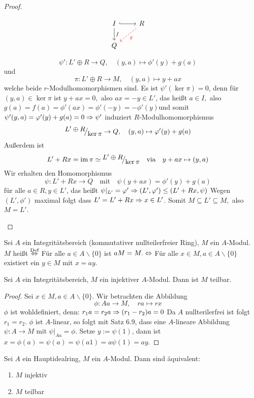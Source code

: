 \begin{proof}
\begin{enumerate}
\begin{minipage}[t]{0.7\textwidth}
		\end{minipage}
		\begin{minipage}[t]{0.3\textwidth} 
			$$\begin{tikzcd}
			I \arrow[hook]{r} \arrow{d}{f}& R \arrow[dashed,red]{dl}{g}\\ Q &
			\end{tikzcd}$$
		\end{minipage}
	 $$\psi': L' \oplus R \to Q,\quad (y,a) \mapsto \phi'(y) + g(a) $$
	und 
	$$\pi: L' \oplus R \to M,\quad(y,a) \mapsto y +ax$$
		welche beide $r$-Modulhomomorphismen sind. Es ist $\psi'(\ker\pi) = 0$, denn für $(y,a) \in \ker\pi$ ist $ y+ax=0,$ also $ax=-y \in L'$, das heißt $a \in I,$ also $g(a)=f(a)=\phi'(ax)=\phi'(-y) = -\phi'(y) $und somit $\psi'(y,a) = \varphi'(y)+g(a) = 0 \Rightarrow \psi'$ induziert $R$-Modulhomomorphismus $$\QR{L' \oplus R}{\ker\pi} \to Q, \quad(y,a) \mapsto \phi'(y)+g(a)$$
		 Außerdem ist $$L'+Rx = \im\pi \simeq \QR{L' \oplus R}{\ker\pi} \quad \text{via}\quad y+ax \mapsto (y,a)$$
		 Wir erhalten den Homomorphismus $$\psi:L'+Rx \to Q \quad \text{mit} \quad\psi(y+ax) = \phi'(y)+g(a) $$ für alle $a \in R, y \in L' $, das heißt $\psi|_{L'} = \varphi' \Rightarrow (L',\varphi') \leq (L'+Rx, \psi) $ Wegen $(L',\phi') $ maximal folgt dass $ L'=L'+Rx \Rightarrow x \in L' $. Somit $M \subseteq L' \subseteq M, $ also $M = L'$.
	\end{enumerate}
\end{proof}
\begin{df}\label{6.10}
	Sei $A$ ein Integritätsbereich (kommutativer nullteilerfreier Ring), $M$ ein $A$-Modul. $M$ heißt  $\overset{\text{Def}}{\Leftrightarrow}$ Für alle $a\in A \backslash \{0\}$ ist $ aM=M. \Leftrightarrow$ Für alle $x \in M, a \in A \backslash \{0\}$ existiert ein $y\in M $ mit $x=ay$.
\end{df}
\begin{bem}\label{6.11}
	Sei $A$ ein Integritätsbereich, $M$ ein injektiver $A$-Modul. Dann ist $M$ teilbar.
\end{bem}
\begin{proof}
	Sei $x \in M , a \in A \backslash \{0\}$. Wir betrachten die Abbildung $$\phi: Aa \to M, \quad ra \mapsto rx$$ $\phi$ ist wohldefiniert, denn: $ r_1a= r_2a \Rightarrow (r_1-r_2)a =0 $ Da $A$ nullterilerfrei ist folgt $r_1=r_2 $. $ \phi$ ist $A$-linear, so folgt mit Satz 6.9, dass eine $A$-lineare Abbildung $\psi: A \to M $ mit $\psi|_{Aa} = \phi$. Setze $y:= \psi(1)$, dann ist $ x = \phi(a)=\psi(a) = \psi(a 1) = a\psi(1)=ay.$
\end{proof}
\begin{bem}\label{6.12}
	Sei $A$ ein Hauptidealring, $M$ ein $A$-Modul. Dann sind äquivalent: 
	\begin{enumerate} [label= \roman*)]
		\item $M$ injektiv 
		\item $M$ teilbar 
	\end{enumerate}
\end{bem}
